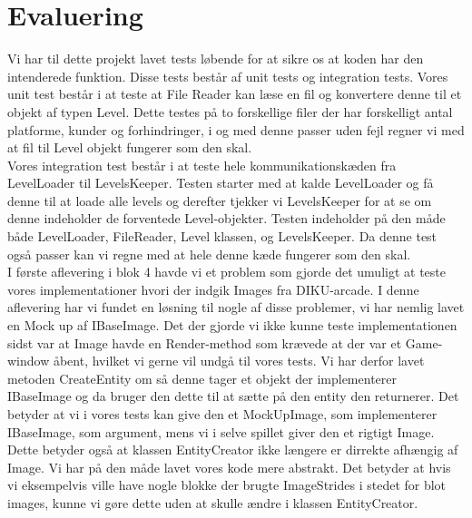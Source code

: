 \section{Evaluering}
   Vi har til dette projekt lavet tests løbende for at sikre os at koden har den intenderede funktion. Disse tests består af unit tests og integration tests. Vores unit test består i at teste at File Reader kan læse en fil og konvertere denne til et objekt af typen Level. Dette testes på to forskellige filer der har forskelligt antal platforme, kunder og forhindringer, i og med denne passer uden fejl regner vi med at fil til Level objekt fungerer som den skal.\\
   Vores integration test består i at teste hele kommunikationskæden fra LevelLoader til LevelsKeeper. Testen starter med at kalde LevelLoader og få denne til at loade alle levels og derefter tjekker vi LevelsKeeper for at se om denne indeholder de forventede Level-objekter. Testen indeholder på den måde både LevelLoader, FileReader, Level klassen, og LevelsKeeper. Da denne test også passer kan vi regne med at hele denne kæde fungerer som den skal.\\
   I første aflevering i blok 4 havde vi et problem som gjorde det umuligt at teste vores implementationer hvori der indgik Images fra DIKU-arcade. I denne aflevering har vi fundet en løsning til nogle af disse problemer, vi har nemlig lavet en Mock up af IBaseImage. Det der gjorde vi ikke kunne teste implementationen sidst var at Image havde en Render-method som krævede at der var et Game-window åbent, hvilket vi gerne vil undgå til vores tests. Vi har derfor lavet metoden CreateEntity om så denne tager et objekt der implementerer IBaseImage og da bruger den dette til at sætte på den entity den returnerer. Det betyder at vi i vores tests kan give den et MockUpImage, som implementerer IBaseImage, som argument, mens vi i selve spillet giver den et rigtigt Image. Dette betyder også at klassen EntityCreator ikke længere er dirrekte afhængig af Image. Vi har på den måde lavet vores kode mere abstrakt. Det betyder at hvis vi eksempelvis ville have nogle blokke der brugte ImageStrides i stedet for blot images, kunne vi gøre dette uden at skulle ændre i klassen EntityCreator.\\
